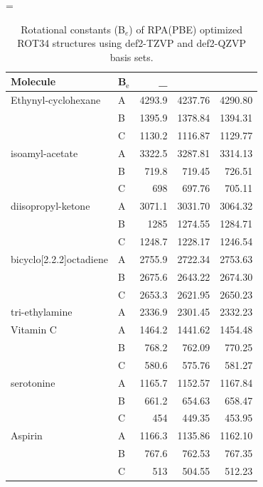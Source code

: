 \documentclass[journal=jctcce,manuscript=article]{achemso}
\begin{document}
\LTcapwidth=\textwidth
\begin{spacing}{1}
\begin{longtable}{llRRR}
  \caption{Rotational constants (B$_e$) of RPA(PBE) optimized ROT34
    structures\cite{C3CP52293H,Risthaus14JComputChem35p1509} 
    using def2-TZVP\cite{Weigend05PhysChemChemPhys7p3297} and 
    def2-QZVP\cite{Weigend03JChemPhys119p12753} basis sets.} \\
    \hline
    Molecule & B$_{\text{e}}$    & _{} &  &  \\
    \hline
    Ethynyl-cyclohexane & A     & 4293.9 & 4237.76 & 4290.80 \\
          & B     & 1395.9 & 1378.84 & 1394.31 \\
          & C     & 1130.2 & 1116.87 & 1129.77 \\
    isoamyl-acetate & A     & 3322.5 & 3287.81 & 3314.13 \\
          & B     & 719.8 & 719.45 & 726.51 \\
          & C     & 698   & 697.76 & 705.11 \\
    diisopropyl-ketone & A     & 3071.1 & 3031.70 & 3064.32 \\
          & B     & 1285  & 1274.55 & 1284.71 \\
          & C     & 1248.7 & 1228.17 & 1246.54 \\
    bicyclo[2.2.2]octadiene & A     & 2755.9 & 2722.34 & 2753.63 \\
          & B     & 2675.6 & 2643.22 & 2674.30 \\
          & C     & 2653.3 & 2621.95 & 2650.23 \\
    tri-ethylamine & A     & 2336.9 & 2301.45 & 2332.23 \\
    Vitamin C & A     & 1464.2 & 1441.62 & 1454.48 \\
          & B     & 768.2 & 762.09 & 770.25 \\
          & C     & 580.6 & 575.76 & 581.27 \\
    serotonine & A     & 1165.7 & 1152.57 & 1167.84 \\
          & B     & 661.2 & 654.63 & 658.47 \\
          & C     & 454   & 449.35 & 453.95 \\
    Aspirin & A     & 1166.3 & 1135.86 & 1162.10 \\
          & B     & 767.6 & 762.53 & 767.35 \\
          & C     & 513   & 504.55 & 512.23 \\

\end{longtable}
\end{spacing}
\end{document}

